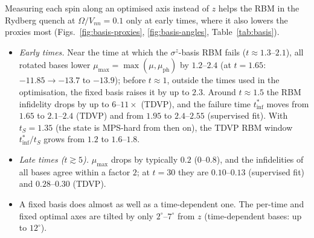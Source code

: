 \documentclass[11pt,a4paper]{article}
\newcommand{\tinf}{t^*_{\mathrm{inf}}}
\begin{document}
Measuring each spin along an optimised axis instead of $z$ helps the RBM in the Rydberg quench at $\Omega/V_{nn}=0.1$
only at early times, where it also lowers the proxies most (Figs.~\ref{fig:basis-proxies}, \ref{fig:basis-angles},
Table~\ref{tab:basis}).
\begin{itemize}
  \item \emph{Early times.} Near the time at which the $\sigma^z$-basis RBM fails ($t\approx1.3$--$2.1$), all rotated bases
    lower $\mu_{\max}=\max(\mu,\mu_{\mathrm{ph}})$ by $1.2$--$2.4$ (at $t=1.65$: $-11.85\to-13.7$ to $-13.9$); before
    $t\approx1$, outside the times used in the optimisation, the fixed basis raises it by up to $2.3$. Around $t\approx1.5$
    the RBM infidelity drops by up to $6$--$11\times$
    (TDVP), and the failure time $\tinf$ moves from $1.65$ to $2.1$--$2.4$ (TDVP) and from $1.95$ to $2.4$--$2.55$
    (supervised fit). With $t_S=1.35$ (the state is MPS-hard from then on), the TDVP RBM window $\tinf/t_S$ grows from
    $1.2$ to $1.6$--$1.8$.
  \item \emph{Late times ($t\gtrsim5$).} $\mu_{\max}$ drops by typically $0.2$ ($0$--$0.8$), and the infidelities of all bases agree
    within a factor $2$; at $t=30$ they are $0.10$--$0.13$ (supervised fit) and $0.28$--$0.30$ (TDVP).
  \item A fixed basis does almost as well as a time-dependent one. The per-time and fixed optimal axes are tilted by
    only $2^\circ$--$7^\circ$ from $z$ (time-dependent bases: up to $12^\circ$).
\end{itemize}
\end{document}

